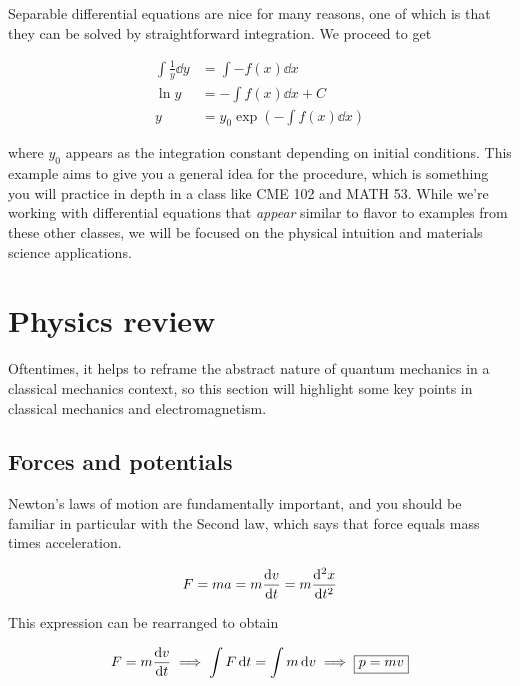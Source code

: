 Separable differential equations are nice for many reasons, one of which is that they can be solved by straightforward integration. 
We proceed to get

\begin{align*}
	\int\frac{1}{y}\dd{y} &= \int-f(x)\dd{x} \\
	\ln y &= -\int f(x)\dd{x} + C \\
	y &= y_0\exp\left(-\int f(x)\dd{x}\right)
\end{align*}

\noindent where $y_0$ appears as the integration constant depending on initial conditions. 
This example aims to give you a general idea for the procedure, which is something you will practice in depth in a class like CME 102 and MATH 53.
While we're working with differential equations that \emph{appear} similar to flavor to examples from these other classes, we will be focused on the physical intuition and materials science applications.



\section{Physics review}

Oftentimes, it helps to reframe the abstract nature of quantum mechanics in a classical mechanics context, so this section will highlight some key points in classical mechanics and electromagnetism.


\subsection{Forces and potentials}

Newton's laws of motion are fundamentally important, and you should be familiar in particular with the Second law, which says that force equals mass times acceleration.

\begin{tcolorbox}[title=Newton's Second law] \vspace{-2ex}
	\[ F = ma = m \dv{v}{t} = m\dv[2]{x}{t} \]
\end{tcolorbox} 

This expression can be rearranged to obtain 

\begin{equation*}
	F = m\dv{v}{t} \implies \int F\dd{t} = \int m\dd{v} \implies \boxed{p = mv}
\end{equation*}


